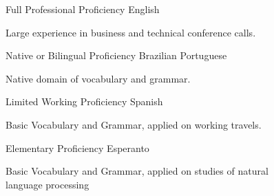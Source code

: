 \noindent
\vspace{-0.5cm}
\begin{multicols}{2}
\begin{cventries}
\noindent
\cventry
        {Full Professional Proficiency}
        {English}{}{}
        {
         \begin{cvitems}
           \item {Large experience in business and technical conference calls.}
          \end{cvitems}
        }
\cventry
        {Native or Bilingual Proficiency}
        {Brazilian Portuguese}{}{}
        {
         \begin{cvitems}
           \item {Native domain of vocabulary and grammar.}
          \end{cvitems}
        }
\end{cventries}
\columnbreak
\begin{cventries}
\noindent
\cventry
        {Limited Working Proficiency}
        {Spanish}{}{}
        {
         \begin{cvitems}
           \item {Basic Vocabulary and Grammar, applied on working travels.}
          \end{cvitems}
        }
\cventry
        {Elementary Proficiency}
        {Esperanto}{}{}
        {
         \begin{cvitems}
           \item {Basic Vocabulary and Grammar, applied on studies of natural \\language processing}
          \end{cvitems}
        }
\end{cventries}
\end{multicols}


